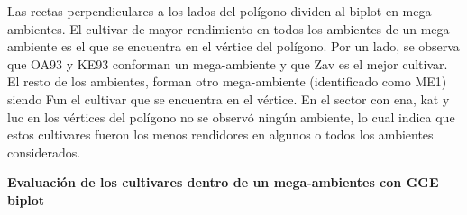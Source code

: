 Las rectas perpendiculares a los lados del polígono dividen al biplot en mega-ambientes. El cultivar de mayor rendimiento en todos los ambientes de un mega-ambiente es el que se encuentra en el vértice del polígono. Por un lado, se observa que OA93 y KE93 conforman un mega-ambiente y que Zav es el mejor cultivar. El resto de los ambientes, forman otro mega-ambiente (identificado como ME1) siendo Fun el cultivar que se encuentra en el vértice. En el sector con ena, kat y luc en los vértices del polígono no se observó ningún ambiente, lo cual indica que estos cultivares fueron los menos rendidores en algunos o todos los ambientes considerados.\\



\textbf{Evaluación de los cultivares dentro de un mega-ambientes con GGE biplot}

